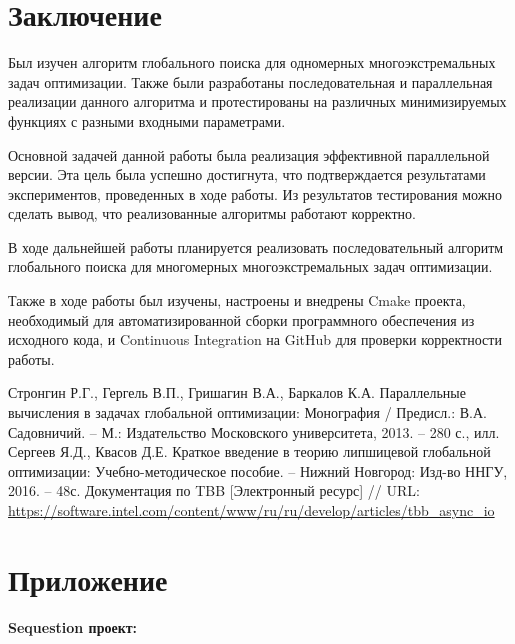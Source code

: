 \documentclass{report}
\begin{document}
\newpage

\section*{Заключение}
Был изучен алгоритм глобального поиска для одномерных многоэкстремальных задач оптимизации. Также были разработаны последовательная и параллельная реализации данного алгоритма и протестированы на различных минимизируемых функциях с разными входными параметрами. 

Основной задачей данной работы была реализация эффективной параллельной версии. Эта цель была успешно достигнута, что подтверждается результатами экспериментов, проведенных в ходе работы. Из результатов тестирования можно сделать вывод, что реализованные алгоритмы работают корректно.

В ходе дальнейшей работы планируется реализовать последовательный алгоритм глобального поиска для многомерных многоэкстремальных задач оптимизации.

Также в ходе работы был изучены, настроены и внедрены Cmake проекта, необходимый для автоматизированной сборки программного обеспечения из исходного кода, и Continuous Integration на GitHub для проверки корректности работы.

\newpage

\begin{thebibliography}{1}
 Стронгин Р.Г., Гергель В.П., Гришагин В.А., Баркалов К.А. Параллельные вычисления в задачах глобальной оптимизации: Монография / Предисл.:  В.А. Садовничий. – М.: Издательство Московского университета, 2013. – 280 с., илл.
 Сергеев Я.Д., Квасов Д.Е. Краткое введение в теорию липшицевой глобальной оптимизации: Учебно-методическое пособие. – Нижний Новгород: Изд-во ННГУ, 2016. – 48с.
Документация по TBB [Электронный ресурс] // URL: \url {https://software.intel.com/content/www/ru/ru/develop/articles/tbb_async_io}
\end{thebibliography}
\newpage

\section*{Приложение}

\setlength{\parindent}{0ex}

\textbf{Sequestion проект:}
\end{document}
